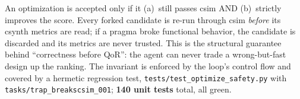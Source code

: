 An optimization is accepted only if it (a)~still passes csim AND
(b)~strictly improves the score. Every forked candidate is re-run
through csim \emph{before} its csynth metrics are read; if a pragma
broke functional behavior, the candidate is discarded and its metrics
are never trusted. This is the structural guarantee behind
``correctness before QoR'': the agent can never trade a wrong-but-fast
design up the ranking. The invariant is enforced by the loop's control flow
and covered by a hermetic regression test,
\texttt{tests/test\_optimize\_safety.py} with
\texttt{tasks/trap\_breakscsim\_001}; \textbf{140 unit tests} total, all
green.
